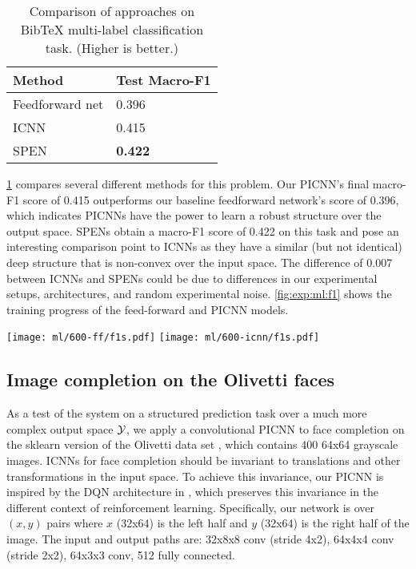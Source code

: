 \begin{table}
\begin{center}
\begin{tabular}{@{}ll@{}}
Method & Test Macro-F1 \\ \hline
Feedforward net & 0.396 \\
ICNN & 0.415 \\
SPEN \citep{belanger2016structured} & \textbf{0.422} \\
\end{tabular}
\caption{Comparison of approaches on BibTeX multi-label classification task.
(Higher is better.)}
\label{table:bibtex}
\end{center}
\end{table}
\cref{table:bibtex} compares several different methods for this problem.
Our PICNN's final macro-F1 score of 0.415 outperforms our
baseline feedforward network's score of 0.396,
which indicates PICNNs have the power to learn a robust
structure over the output space.
SPENs obtain a macro-F1 score of 0.422 on this task \citep{belanger2016structured}
and pose an interesting comparison point to ICNNs as they have
a similar (but not identical) deep structure that is non-convex
over the input space.
The difference of 0.007 between ICNNs and SPENs could be due
to differences in our experimental setups, architectures,
and random experimental noise.
\cref{fig:exp:ml:f1} shows the training progress of the
feed-forward and PICNN models.

\begin{figure*}[h]
  \centering
  \texttt{[image: ml/600-ff/f1s.pdf]}
  \texttt{[image: ml/600-icnn/f1s.pdf]}
  \caption{
    Training (blue) and test (red) macro-F1 score of
    a feedforward network (left) and PICNN (right) on the BibTeX
    multi-label classification dataset.
    The final test F1 scores are 0.396 and 0.415, respectively.
    (Higher is better.)
  }
  \label{fig:exp:ml:f1}
\end{figure*}

\subsection{Image completion on the Olivetti faces}
As a test of the system on a structured prediction task over a
much more complex output space $\cal{Y}$, we apply a
convolutional PICNN to face completion on the
sklearn version \citep{pedregosa2011scikit} of the Olivetti
data set \citep{samaria1994parameterisation}, which contains
400 64x64 grayscale images.
ICNNs for face completion should be invariant to translations
and other transformations in the input space.
To achieve this invariance, our PICNN is inspired by the
DQN architecture in \citet{mnih2015human}, which preserves
this invariance in the different context of reinforcement learning.
Specifically, our network
is over $(x,y)$ pairs where
$x$ (32x64) is the left half and $y$ (32x64)
is the right half of the image.
The input and output paths are:
32x8x8 conv (stride 4x2), 64x4x4 conv (stride 2x2),
64x3x3 conv, 512 fully connected.

